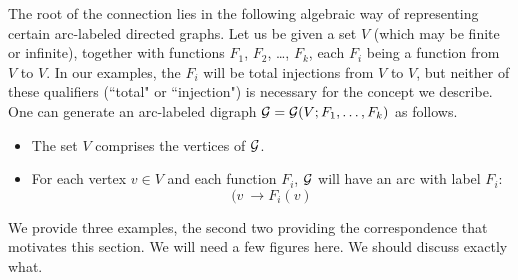 The root of the connection lies in the following algebraic way of representing certain 
arc-labeled directed graphs.  Let us be given a set $V$ (which may be finite or infinite),  
together with functions $F_1$,  $F_2$, \ldots, $F_k$, each $F_i$ being a function from 
$V$ to $V$.  In our examples, the $F_i$ will be total injections from $V$ to $V$, but neither 
of these qualifiers (``total" or ``injection") is necessary for the concept we describe.  One 
can generate an arc-labeled digraph $\mbox{$\cal G$} = \mbox{$\cal G$}(V; F_1, \ldots, F_k)$ as follows.
\begin{itemize}
\item
The set $V$ comprises the vertices of $\mbox{$\cal G$}$.
\item
For each vertex $v \in V$ and each function $F_i$, $\mbox{$\cal G$}$ will have an arc with label $F_i$:
\[ (v \ \rightarrow F_i(v) \]
\end{itemize}
We provide three examples, the second two providing the correspondence that motivates this section.
{\Arny We will need a few figures here.  We should discuss exactly what.}

\medskip

